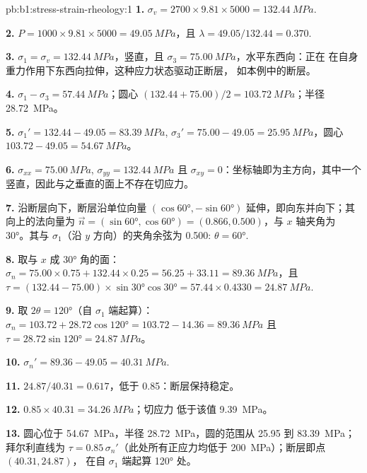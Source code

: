 \begin{solution}{pb:b1:stress-strain-rheology:1}
\textbf{1.} $\sigma_v = 2700\times9.81\times5000 = \qty{132.44}{MPa}$.

\textbf{2.} $P = 1000\times9.81\times5000 = \qty{49.05}{MPa}$，且
$\lambda = 49.05/132.44 = 0.370$.

\textbf{3.} $\sigma_1 = \sigma_v = \qty{132.44}{MPa}$，竖直，且
$\sigma_3 = \qty{75.00}{MPa}$，水平东西向：正在
在自身重力作用下东西向拉伸，这种应力状态驱动正断层，
如本例中的断层。

\textbf{4.} $\sigma_1 - \sigma_3 = \qty{57.44}{MPa}$；圆心
$(132.44 + 75.00)/2 = \qty{103.72}{MPa}$；半径 \qty{28.72}{MPa}。

\textbf{5.} $\sigma_1' = 132.44 - 49.05 = \qty{83.39}{MPa}$, $\sigma_3' =
75.00 - 49.05 = \qty{25.95}{MPa}$，圆心 $103.72 - 49.05 = \qty{54.67}{MPa}$。

\textbf{6.} $\sigma_{xx} = \qty{75.00}{MPa}$, $\sigma_{yy} = \qty{132.44}{MPa}$
且 $\sigma_{xy} = 0$：坐标轴即为主方向，其中一个
竖直，因此与之垂直的面上不存在切应力。

\textbf{7.} 沿断层向下，断层沿单位向量
$(\cos\ang{60}, -\sin\ang{60})$ 延伸，即向东并向下；其向上的法向量为
$\vec n = (\sin\ang{60}, \cos\ang{60}) = (0.866, 0.500)$，与
$x$ 轴夹角为 \ang{30}。其与 $\sigma_1$（沿 $y$ 方向）的夹角余弦为
0.500: $\theta = \ang{60}$.

\textbf{8.} 取与 $x$ 成 \ang{30} 角的面：$\sigma_n = 75.00\times0.75 + 132.44\times0.25
= 56.25 + 33.11 = \qty{89.36}{MPa}$，且 $\tau = (132.44 - 75.00)\times
\sin\ang{30}\cos\ang{30} = 57.44\times0.4330 = \qty{24.87}{MPa}$.

\textbf{9.} 取 $2\theta = \ang{120}$（自 $\sigma_1$ 端起算）：
$\sigma_n = 103.72 + 28.72\cos\ang{120} = 103.72 - 14.36 = \qty{89.36}{MPa}$
且 $\tau = 28.72\sin\ang{120} = \qty{24.87}{MPa}$。

\textbf{10.} $\sigma_n' = 89.36 - 49.05 = \qty{40.31}{MPa}$.

\textbf{11.} $24.87/40.31 = 0.617$，低于 0.85：断层保持稳定。

\textbf{12.} $0.85\times40.31 = \qty{34.26}{MPa}$；切应力
低于该值 \qty{9.39}{MPa}。

\textbf{13.} 圆心位于 \qty{54.67}{MPa}，半径
\qty{28.72}{MPa}，圆的范围从 \num{25.95} 到 \qty{83.39}{MPa}；拜尔利直线为
$\tau = 0.85\,\sigma_n'$（此处所有正应力均低于
\qty{200}{MPa}）；断层即点 $(40.31, 24.87)$，
在自 $\sigma_1$ 端起算 \ang{120} 处。


\end{solution}
